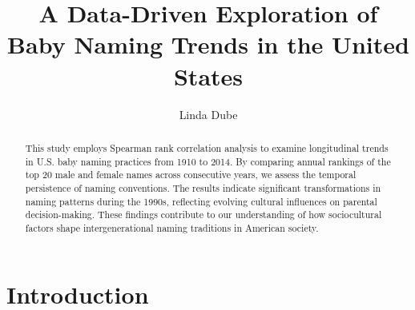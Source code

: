 \documentclass[11pt,preprint]{elsarticle}
\numberwithin{equation}{section}
\numberwithin{figure}{section}
\numberwithin{table}{section}
\begin{document}
\begin{frontmatter}  %

\title{A Data-Driven Exploration of Baby Naming Trends in the United
States}





\author[Add1]{Linda Dube}





\address[Add1]{Stellenbosch University, Western Cape}


\begin{abstract}
\small{
This study employs Spearman rank correlation analysis to examine
longitudinal trends in U.S. baby naming practices from 1910 to 2014. By
comparing annual rankings of the top 20 male and female names across
consecutive years, we assess the temporal persistence of naming
conventions. The results indicate significant transformations in naming
patterns during the 1990s, reflecting evolving cultural influences on
parental decision-making. These findings contribute to our understanding
of how sociocultural factors shape intergenerational naming traditions
in American society.
}
\end{abstract}

\vspace{1cm}





\vspace{0.5cm}

\end{frontmatter}

\setcounter{footnote}{0}



\pagestyle{fancy}
\chead{}
\rhead{}
\lfoot{}
\lhead{}
\cfoot{}


\headsep 35pt %




\section{\texorpdfstring{Introduction
\label{Introduction}}{Introduction }}\label{introduction}
\end{document}
